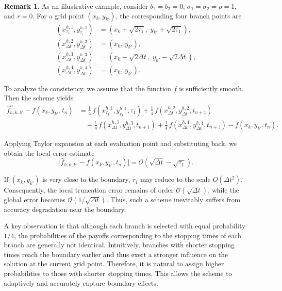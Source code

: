 \documentclass[11pt]{article}
\theoremstyle{mythm}
\theoremstyle{definition}
\newtheorem{remark}{Remark}
\begin{document}
	\begin{remark}
		As an illustrative example, consider $b_1=b_2=0$, $\sigma_1=\sigma_2=\rho=1$, and $r=0$.  
		For a grid point $(x_k, y_{k'})$, the corresponding four branch points are
		\[
		\begin{aligned}
			(x_{\tau_1}^{h,1}, y_{\tau_1}^{h,1}) 
			&= (x_k + \sqrt{2\tau_1},\; y_{k'} + \sqrt{2\tau_1}),\\
			(x_{\Delta t}^{h,2}, y_{\Delta t}^{h,2}) 
			&= (x_k,\, y_{k'}),\\
			(x_{\Delta t}^{h,3}, y_{\Delta t}^{h,3}) 
			&= (x_k - \sqrt{2\Delta t},\; y_{k'} - \sqrt{2\Delta t}),\\
			(x_{\Delta t}^{h,4}, y_{\Delta t}^{h,4}) 
			&= (x_k,\, y_{k'}).
		\end{aligned}
		\]
	\end{remark}
	To analyze the consistency, we assume that the function $f$ is sufficiently smooth. Then the scheme yields
	\[
	\begin{aligned}
		\hat f_{h,k,k'}^n - f(x_k, y_{k'}, t_n)
		&= \tfrac14\,f(x_{\tau_1}^{h,1}, y_{\tau_1}^{h,1}, \tau_1)
		+ \tfrac14\,f(x_{\Delta t}^{h,2}, y_{\Delta t}^{h,2}, t_{n+1})  \\
		&\quad+ \tfrac14\,f(x_{\Delta t}^{h,3}, y_{\Delta t}^{h,3}, t_{n+1})
		+ \tfrac14\,f(x_{\Delta t}^{h,4}, y_{\Delta t}^{h,4}, t_{n+1})
		- f(x_k, y_{k'}, t_n).
	\end{aligned}
	\]
	
	Applying Taylor expansion at each evaluation point and substituting back, we obtain the local error estimate
	\[
	\bigl| \hat f_{h,k,k'} - f(x_k, y_{k'}, t_n) \bigr|
	= \mathcal{O}(\sqrt{\Delta t}-\sqrt{\tau_1}).
	\]
	
	If $(x_k, y_{k'})$ is very close to the boundary, $\tau_1$ may reduce to the scale $O(\Delta t^2)$. Consequently, the local truncation error remains of order $\mathcal{O}(\sqrt{\Delta t})$, while the global error becomes $\mathcal{O}(1/\sqrt{\Delta t})$. Thus, such a scheme inevitably suffers from accuracy degradation near the boundary.
	
	A key observation is that although each branch is selected with equal probability $1/4$, the probabilities of the payoffs corresponding to the stopping times of each branch are generally not identical. Intuitively, branches with shorter stopping times reach the boundary earlier and thus exert a stronger influence on the solution at the current grid point. Therefore, it is natural to assign higher probabilities to those with shorter stopping times. This allows the scheme to adaptively and accurately capture boundary effects.
	
\end{document}
